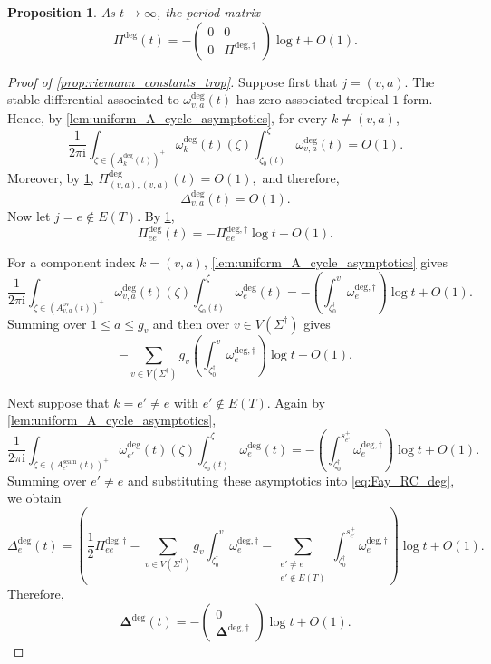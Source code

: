 \documentclass[10pt,a4paper]{amsart}
\newtheorem{proposition}{Proposition}
\def\RC{{\Delta}}
\def\basept{{\ptSig_0}}
\def\baseptT{{\ptSig_0^\trop}}
\def\edges{E}
\def\imunit{{\mathrm{i}}}
\def\mcurve{\Sigma}
\def\ptSig{\zeta}
\def\trop{\dagger}
\def\tropmcurve{\mcurve^\trop}
\def\vecRC{\bm{\Delta}}
\def\vertices{V}
\begin{document}
\begin{proposition}
\label{cor:periodtropical}
As \(t\to\infty\), the period matrix
\begin{equation}
\Pi^{\mathrm{deg}}(t)
=
-
\begin{pmatrix}
0&0\\
0&\Pi^{\mathrm{deg},\trop}
\end{pmatrix}
\log t
+
O(1).
\label{eq:period_asympotics_ov}
\end{equation}
\end{proposition}

\begin{proof}[Proof of \cref{prop:riemann_constants_trop}]
Suppose first that
$
j=(v,a).
$
The stable differential associated to
$\omega_{v,a}^{\mathrm{deg}}(t)$ has zero associated tropical $1$-form.
Hence, by \cref{lem:uniform_A_cycle_asymptotics}, for every
$k\neq(v,a)$,
\[
\frac{1}{2\pi\imunit}
\int_{\zeta\in(A_k^{\mathrm{deg}}(t))^+}
\omega_k^{\mathrm{deg}}(t)(\zeta)
\int_{\basept(t)}^\zeta
\omega_{v,a}^{\mathrm{deg}}(t)
=
O(1).
\]
Moreover, by \cref{cor:periodtropical},
$
\Pi_{(v,a),(v,a)}^{\mathrm{deg}}(t)
=
O(1),
$
and therefore,
\[
\RC_{v,a}^{\mathrm{deg}}(t)
=
O(1).
\]
Now let
$
j=e\notin\edges(T).
$
By \cref{cor:periodtropical},
\[
\Pi_{ee}^{\mathrm{deg}}(t)
=
-
\Pi_{ee}^{\mathrm{deg},\trop}
\log t
+
O(1).
\]

For a component index $k=(v,a)$,
\cref{lem:uniform_A_cycle_asymptotics} gives
\[
\frac{1}{2\pi\imunit}
\int_{\zeta\in(A_{v,a}^{\mathrm{ov}}(t))^+}
\omega_{v,a}^{\mathrm{deg}}(t)(\zeta)
\int_{\basept(t)}^\zeta
\omega_e^{\mathrm{deg}}(t)
=
-
\left(
\int_{\baseptT}^{v}
\omega_e^{\mathrm{deg},\trop}
\right)
\log t
+
O(1).
\]
Summing over $1\leq a\leq g_v$ and then over
$v\in\vertices(\tropmcurve)$ gives
\[
-
\sum_{v\in\vertices(\tropmcurve)}
g_v
\left(
\int_{\baseptT}^{v}
\omega_e^{\mathrm{deg},\trop}
\right)
\log t
+
O(1).
\]

Next suppose that
$
k=e'\neq e$ with $e'\notin\edges(T).
$
Again by \cref{lem:uniform_A_cycle_asymptotics},
\[
\frac{1}{2\pi\imunit}
\int_{\zeta\in(A_{e'}^{\mathrm{seam}}(t))^+}
\omega_{e'}^{\mathrm{deg}}(t)(\zeta)
\int_{\basept(t)}^\zeta
\omega_e^{\mathrm{deg}}(t)
=
-
\left(
\int_{\baseptT}^{s_{e'}^+}
\omega_e^{\mathrm{deg},\trop}
\right)
\log t
+
O(1).
\]
Summing over $e'\neq e$ and substituting these asymptotics into
\eqref{eq:Fay_RC_deg}, we obtain
\[
\RC_e^{\mathrm{deg}}(t)
=
\left(
\frac12\Pi_{ee}^{\mathrm{deg},\trop}
-
\sum_{v\in\vertices(\tropmcurve)}
g_v
\int_{\baseptT}^{v}
\omega_e^{\mathrm{deg},\trop}
-
\sum_{\substack{
e'\neq e\\
e'\notin\edges(T)
}}
\int_{\baseptT}^{s_{e'}^+}
\omega_e^{\mathrm{deg},\trop}
\right)
\log t
+
O(1).
\]
Therefore,
\[
\vecRC^{\mathrm{deg}}(t)
=
-
\begin{pmatrix}
0\\
\vecRC^{\mathrm{deg},\trop}
\end{pmatrix}
\log t
+
O(1).
\]
\end{proof}
\end{document}
